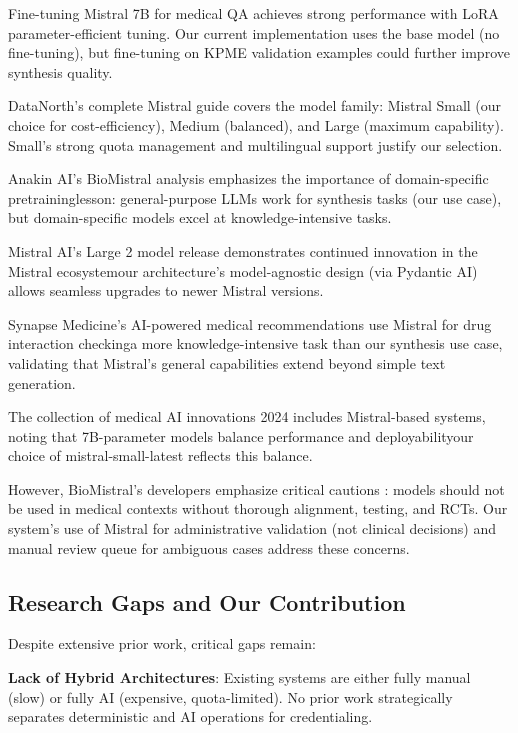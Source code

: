 \documentclass[conference]{IEEEtran}
\begin{document}
Fine-tuning Mistral 7B for medical QA \cite{medium2024mistral} achieves strong performance with LoRA parameter-efficient tuning. Our current implementation uses the base model (no fine-tuning), but fine-tuning on KPME validation examples could further improve synthesis quality.

DataNorth's complete Mistral guide \cite{datanorth2024mistral} covers the model family: Mistral Small (our choice for cost-efficiency), Medium (balanced), and Large (maximum capability). Small's strong quota management and multilingual support justify our selection.

Anakin AI's BioMistral analysis \cite{anakin2024biomistral} emphasizes the importance of domain-specific pretraininglesson: general-purpose LLMs work for synthesis tasks (our use case), but domain-specific models excel at knowledge-intensive tasks.

Mistral AI's Large 2 model release \cite{aifrontierist2024mistral} demonstrates continued innovation in the Mistral ecosystemour architecture's model-agnostic design (via Pydantic AI) allows seamless upgrades to newer Mistral versions.

Synapse Medicine's AI-powered medical recommendations \cite{mistral2024synapse} use Mistral for drug interaction checkinga more knowledge-intensive task than our synthesis use case, validating that Mistral's general capabilities extend beyond simple text generation.

The collection of medical AI innovations 2024 \cite{arxiv2025innovations} includes Mistral-based systems, noting that 7B-parameter models balance performance and deployabilityour choice of mistral-small-latest reflects this balance.

However, BioMistral's developers emphasize critical cautions \cite{biomistral2024}: models should not be used in medical contexts without thorough alignment, testing, and RCTs. Our system's use of Mistral for administrative validation (not clinical decisions) and manual review queue for ambiguous cases address these concerns.

\subsection{Research Gaps and Our Contribution}

Despite extensive prior work, critical gaps remain:

\textbf{Lack of Hybrid Architectures}: Existing systems are either fully manual (slow) or fully AI (expensive, quota-limited). No prior work strategically separates deterministic and AI operations for credentialing.
\end{document}
